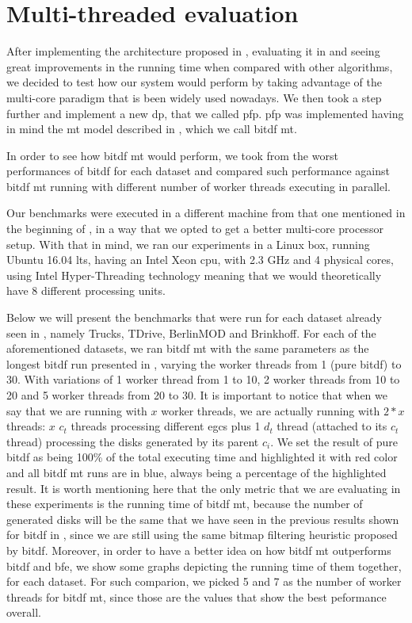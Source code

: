 {%
\section{Multi-threaded evaluation}
After implementing the architecture proposed in , evaluating it in  and
seeing great improvements in the running time when compared with other algorithms, we decided to test how our system
would perform by taking advantage of the multi-core paradigm that is been widely used nowadays. We then took a step
further and implement a new \ac{dp}, that we called \ac{pfp}. \ac{pfp} was implemented having in mind the \ac{mt} model
described in , which we call \ac{bitdf} \ac{mt}.

In order to see how \ac{bitdf} \ac{mt} would perform, we took from  the worst performances of
\ac{bitdf} for each dataset and compared such performance against \ac{bitdf} \ac{mt} running with different number of
worker threads executing in parallel.

Our benchmarks were executed in a different machine from that one mentioned in the beginning of ,
in a way that we opted to get a better multi-core processor setup. With that in mind, we ran our experiments in a Linux
box, running Ubuntu 16.04 \ac{lts}, having an Intel Xeon \ac{cpu}, with 2.3 GHz and 4 physical cores, using Intel
Hyper-Threading technology \citep{hyper} meaning that we would theoretically have 8 different processing units.

Below we will present the benchmarks that were run for each dataset already seen in , namely
Trucks, TDrive, BerlinMOD and Brinkhoff. For each of the aforementioned datasets, we ran \ac{bitdf} \ac{mt} with the
same parameters as the longest \ac{bitdf} run presented in , varying the worker threads from 1
(pure \ac{bitdf}) to 30. With variations of 1 worker thread from 1 to 10, 2 worker threads from 10 to 20 and 5 worker
threads from 20 to 30. It is important to notice that when we say that we are running with $x$ worker threads, we are
actually running with $2*x$ threads: $x$ $c_t$ threads processing different \acp{egc} plus 1 $d_t$ thread (attached to
its $c_t$ thread) processing the disks generated by its parent $c_i$. We set the result of pure \ac{bitdf} as being
100\% of the total executing time and highlighted it with red color and all \ac{bitdf} \ac{mt} runs are in blue, always
being a percentage of the highlighted result. It is worth mentioning here that the only metric that we are evaluating in
these experiments is the running time of \ac{bitdf} \ac{mt}, because the number of generated disks will be the same that
we have seen in the previous results shown for \ac{bitdf} in , since we are still using the same
bitmap filtering heuristic proposed by \ac{bitdf}. Moreover, in order to have a better idea on how \ac{bitdf} \ac{mt}
outperforms \ac{bitdf} and \ac{bfe}, we show some graphs depicting the running time of them together, for each dataset.
For such comparion, we picked 5 and 7 as the number of worker threads for \ac{bitdf} \ac{mt}, since those are the values
that show the best peformance overall.

}
